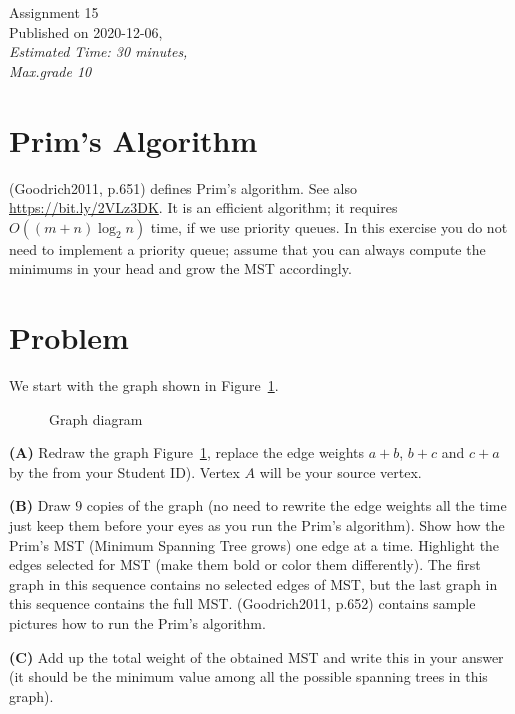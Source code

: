 \documentclass[a4paper,12pt]{article}
\begin{document}
\twocolumn

\thispagestyle{empty}

\begin{center}
{\Large Assignment 15}\\
{\Large Published on 2020-12-06,}\\
{\em Estimated Time: 30 minutes,}\\
{\em Max.grade 10\textperthousand} 
\end{center}


\section{Prim's Algorithm}

(Goodrich2011, p.651) defines Prim's algorithm. 
See also \url{https://bit.ly/2VLz3DK}. 
It is an efficient algorithm; it requires $O((m+n)\log_2 n)$ time, if 
we use priority queues. 
In this exercise you do not need to implement a priority queue; 
assume that you can always compute the minimums in your head and
grow the MST accordingly.



\section{Problem}

We start with the graph shown in Figure~\ref{fig:problem-graph}.

\begin{figure}[!htb]
\caption{\label{fig:problem-graph} Graph diagram}
\end{figure}



\vspace{10pt}
{\bf (A)} Redraw the graph Figure~\ref{fig:problem-graph},
replace the edge weights $a+b$, $b+c$ and $c+a$ by the from your Student ID). 
Vertex $A$ will be your source vertex. 


\vspace{10pt}
{\bf (B)} Draw $9$ copies of the graph (no need to rewrite
the edge weights all the time \textendash{} just keep them before your eyes
as you run the Prim's algorithm). 
Show how the Prim's MST (Minimum Spanning Tree grows) one edge at a time. 
Highlight the edges selected for MST (make them bold or color them differently).
The first graph in this sequence contains no selected edges of MST, but 
the last graph in this sequence contains the full MST.
(Goodrich2011, p.652) contains sample pictures how to run the Prim's algorithm.

\vspace{10pt}
{\bf (C)} Add up the total weight of the obtained MST and 
write this in your answer (it should be the minimum value among all the
possible spanning trees in this graph). 
\end{document}
